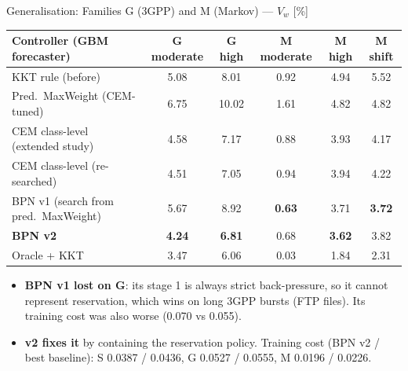 \documentclass[aspectratio=169,11pt,xcolor=table]{beamer}
\newcommand{\best}[1]{\textbf{\textcolor{good}{#1}}}
\begin{document}
\begin{frame}{Generalisation: Families G (3GPP) and M (Markov) --- $V_w$ [\%]}
  \small
  \centering
  \begin{tabular}{lccccc}
    \toprule
    Controller (GBM forecaster) & G moderate & G high & M moderate & M high & M shift \\
    \midrule
    KKT rule (before) & 5.08 & 8.01 & 0.92 & 4.94 & 5.52 \\
    Pred.\ MaxWeight (CEM-tuned) & 6.75 & 10.02 & 1.61 & 4.82 & 4.82 \\
    CEM class-level (extended study) & 4.58 & 7.17 & 0.88 & 3.93 & 4.17 \\
    CEM class-level (re-searched) & 4.51 & 7.05 & 0.94 & 3.94 & 4.22 \\
    BPN v1 (search from pred.\ MaxWeight) & 5.67 & 8.92 & \best{0.63} & 3.71 & \best{3.72} \\
    \rowcolor{good!10} \textbf{BPN v2} & \best{4.24} & \best{6.81} & 0.68 & \best{3.62} & 3.82 \\
    Oracle + KKT & 3.47 & 6.06 & 0.03 & 1.84 & 2.31 \\
    \bottomrule
  \end{tabular}
  \normalsize
  \vspace{4pt}
  \begin{itemize}\footnotesize
    \item \textbf{BPN v1 lost on G}: its stage 1 is always strict back-pressure, so it cannot represent reservation, which wins on long 3GPP bursts (FTP files). Its training cost was also worse (0.070 vs 0.055).
    \item \textbf{v2 fixes it} by containing the reservation policy. Training cost (BPN v2 / best baseline): S 0.0387 / 0.0436, G 0.0527 / 0.0555, M 0.0196 / 0.0226.
  \end{itemize}
\end{frame}
\end{document}
